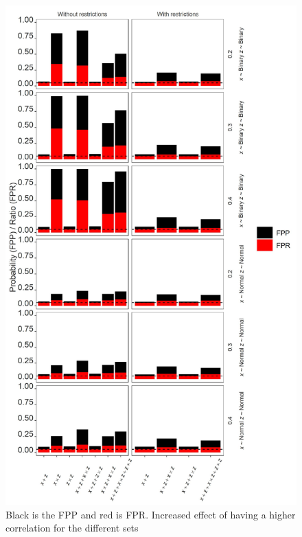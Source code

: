 \begin{figure}[t]
\includegraphics{R/Analysis/Result/Figures/Figure2SI.jpeg}
\centering
\caption{Black is the FPP and red is FPR.  Increased effect of having a higher correlation for the different sets}
\label{fig:mainfigure}
\end{figure}

